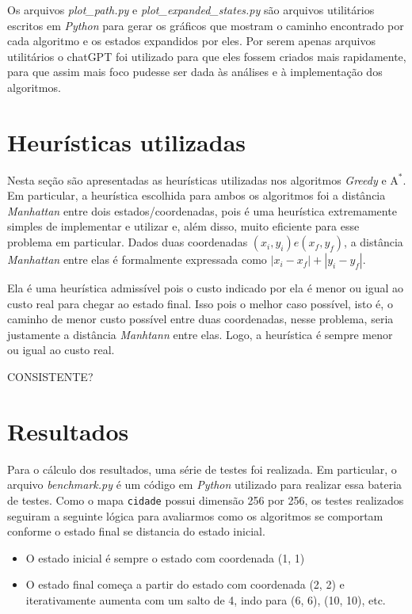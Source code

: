 \documentclass{article}
\begin{document}
Os arquivos \textit{plot\_path.py} e \textit{plot\_expanded\_states.py} são arquivos utilitários escritos em \textit{Python} para gerar os gráficos que mostram o caminho encontrado por cada algoritmo
e os estados expandidos por eles. Por serem apenas arquivos utilitários o chatGPT foi utilizado para que eles fossem criados mais rapidamente, para que assim mais foco pudesse ser dada às análises e à implementação dos algoritmos.

\section{Heurísticas utilizadas}

Nesta seção são apresentadas as heurísticas utilizadas nos algoritmos \textit{Greedy} e \(\text{A}^*\). Em particular, a heurística escolhida para ambos os algoritmos
foi a distância \textit{Manhattan} entre dois estados/coordenadas, pois é uma heurística extremamente simples de implementar e utilizar e, além disso, muito eficiente para esse problema em particular.
Dados duas coordenadas \((x_i, y_i) e (x_f, y_f)\), a distância \textit{Manhattan} entre elas é formalmente expressada como \(|x_i - x_f| + |y_i - y_f|\).

Ela é uma heurística admissível pois o custo indicado por ela é menor ou igual ao custo real para chegar ao estado final. Isso pois o melhor caso possível, isto é, o caminho de menor custo possível
entre duas coordenadas, nesse problema, seria justamente a distância \textit{Manhtann} entre elas. Logo, a heurística é sempre menor ou igual ao custo real.

CONSISTENTE?

\section{Resultados}

Para o cálculo dos resultados, uma série de testes foi realizada. Em particular, o arquivo \textit{benchmark.py} é um código em \textit{Python} utilizado para realizar essa bateria de testes.
Como o mapa \texttt{cidade} possui dimensão 256 por 256, os testes realizados seguiram a seguinte lógica para avaliarmos como os algoritmos se comportam conforme o estado final
se distancia do estado inicial.

\begin{itemize}
	\item O estado inicial é sempre o estado com coordenada (1, 1)
	\item O estado final começa a partir do estado com coordenada (2, 2) e iterativamente aumenta com um salto de 4, indo para
	      (6, 6), (10, 10), etc.
\end{itemize}
\end{document}
